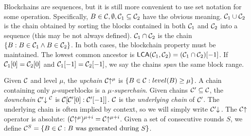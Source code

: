 Blockchains are sequences, but it is still more convenient to use set notation for some operation. Specifically, $B \in \mathcal{C},
\emptyset, \mathcal{C}_1 \subseteq \mathcal{C}_2$ have the obvious meaning. $\mathcal{C}_1 \cup
\mathcal{C}_2$ is the chain obtained by sorting the blocks contained in both
$\mathcal{C}_1$ and $\mathcal{C}_2$ into a sequence (this may be not always defined).
$\mathcal{C}_1 \cap \mathcal{C}_2$ is the chain
$\{B: B \in \mathcal{C}_1 \land B \in \mathcal{C}_2\}$. In both cases, the blockchain property
must be maintained. The lowest common ancestor is $\textsf{LCA}(\mathcal{C}_1,
\mathcal{C}_2) = (\mathcal{C}_1 \cap \mathcal{C}_2)[-1]$. %
If $\mathcal{C}_1[0] = \mathcal{C}_2[0]$ and
$\mathcal{C}_1[-1] = \mathcal{C}_2[-1]$, we say the chains \textit{span} the same
block range.

Given $\mathcal{C}$ and level $\mu$, the \textit{upchain}
$\mathcal{C}\negthickspace\uparrow^\mu$ is $\{B \in \mathcal{C}: level(B) \geq \mu\}$. A chain
containing only $\mu$-superblocks is a $\mu$\textit{-superchain}. Given chains
$\mathcal{C}' \subseteq \mathcal{C}$, the \textit{downchain}
$\mathcal{C}'\negthickspace\downarrow\,\!^{\mathcal{C}}$ is $\mathcal{C}[\mathcal{C}'[0]:\mathcal{C}'[-1]]$. $\mathcal{C}$ is the
\textit{underlying chain} of $\mathcal{C}'$. The underlying chain is often implied by
context, so we will simply write $\mathcal{C}'\negthickspace\downarrow\,$. The $\mathcal{C}\negthickspace\uparrow$
operator is absolute: $(\mathcal{C}\negthickspace\uparrow^\mu)^{\mu + i} = \mathcal{C}\negthickspace\uparrow^{\mu +
i}$. Given a set of consecutive rounds $S$, we define $\mathcal{C}^S = \{B \in
\mathcal{C}: B \text{ was generated during } S\}$.
